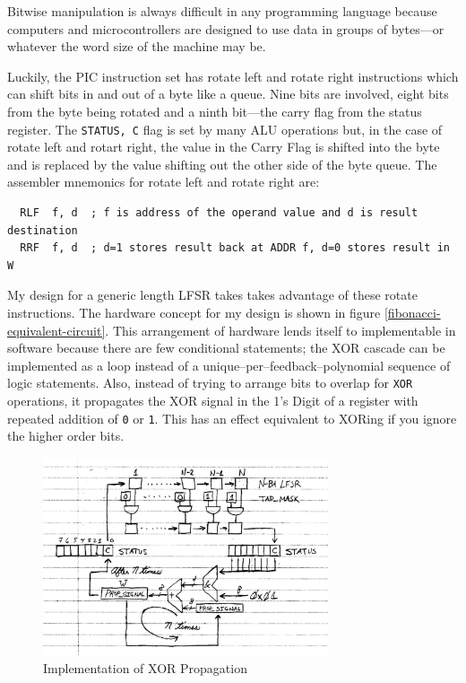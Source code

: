 \documentclass[11pt]{article}
\begin{document}
Bitwise manipulation is always difficult in any programming language because
computers and microcontrollers are designed to use data in groups of bytes---or
whatever the word size of the machine may be.

Luckily, the PIC instruction set has rotate left and rotate right instructions
which can shift bits in and out of a byte like a queue. Nine bits are involved,
eight bits from the byte being rotated and a ninth bit---the carry flag from
the status register. The \texttt{STATUS, C} flag is set by many ALU operations but, in the case
of rotate left and rotart right, the value in the Carry Flag is shifted into
the byte and is replaced by the value shifting out the other side of the byte queue.
The assembler mnemonics for rotate left and rotate right are:
\begin{verbatim}
  RLF  f, d  ; f is address of the operand value and d is result destination
  RRF  f, d  ; d=1 stores result back at ADDR f, d=0 stores result in W
\end{verbatim}

My design for a generic length LFSR takes takes advantage of these rotate instructions.
The hardware concept for my design is shown in figure \ref{fibonacci-equivalent-circuit}.
This arrangement of hardware lends itself to implementable in software because there are few
conditional statements; the XOR cascade can be implemented as a loop instead of
a unique--per--feedback--polynomial sequence of logic statements. Also, instead of
trying to arrange bits to overlap for \texttt{XOR} operations, it propagates the
XOR signal in the 1's Digit of a register with repeated addition of \texttt{0} or \texttt{1}.
This has an effect equivalent to XORing if you ignore the higher order bits.

\begin{figure}
	\centering
	\includegraphics[width=0.75\textwidth]{Figures/xor-propagation-flowchart.pdf}
	\caption{Implementation of XOR Propagation}
	\label{xor-propagation-flowchart}
\end{figure}
\end{document}
